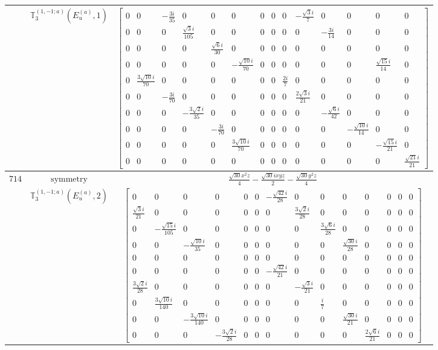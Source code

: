 \documentclass[fleqn,8pt,landscape]{jsarticle}
\begin{document}
\begin{longtable}{ccc}
$  $ & $ \mathbb{T}_{3}^{(1,-1;a)}(E_{u}^{(a)},1) $ & $ \begin{bmatrix} 0 & 0 & - \frac{3 i}{35} & 0 & 0 & 0 & 0 & 0 & 0 & - \frac{\sqrt{3} i}{7} & 0 & 0 & 0 & 0 \\ 0 & 0 & 0 & \frac{\sqrt{3} i}{105} & 0 & 0 & 0 & 0 & 0 & 0 & - \frac{3 i}{14} & 0 & 0 & 0 \\ 0 & 0 & 0 & 0 & \frac{\sqrt{6} i}{30} & 0 & 0 & 0 & 0 & 0 & 0 & 0 & 0 & 0 \\ 0 & 0 & 0 & 0 & 0 & - \frac{\sqrt{10} i}{70} & 0 & 0 & 0 & 0 & 0 & 0 & \frac{\sqrt{15} i}{14} & 0 \\ 0 & \frac{3 \sqrt{10} i}{70} & 0 & 0 & 0 & 0 & 0 & 0 & \frac{2 i}{7} & 0 & 0 & 0 & 0 & 0 \\ 0 & 0 & - \frac{3 i}{70} & 0 & 0 & 0 & 0 & 0 & 0 & \frac{2 \sqrt{3} i}{21} & 0 & 0 & 0 & 0 \\ 0 & 0 & 0 & - \frac{3 \sqrt{2} i}{35} & 0 & 0 & 0 & 0 & 0 & 0 & - \frac{\sqrt{6} i}{42} & 0 & 0 & 0 \\ 0 & 0 & 0 & 0 & - \frac{3 i}{70} & 0 & 0 & 0 & 0 & 0 & 0 & - \frac{\sqrt{10} i}{14} & 0 & 0 \\ 0 & 0 & 0 & 0 & 0 & \frac{3 \sqrt{10} i}{70} & 0 & 0 & 0 & 0 & 0 & 0 & - \frac{\sqrt{15} i}{21} & 0 \\ 0 & 0 & 0 & 0 & 0 & 0 & 0 & 0 & 0 & 0 & 0 & 0 & 0 & \frac{\sqrt{21} i}{21} \end{bmatrix} $ \\ \hline
$ 714 $ & $ \text{symmetry} $ & $ \frac{\sqrt{30} x^{2} z}{4} - \frac{\sqrt{30} i x y z}{2} - \frac{\sqrt{30} y^{2} z}{4} $ \\
$  $ & $ \mathbb{T}_{3}^{(1,-1;a)}(E_{u}^{(a)},2) $ & $ \begin{bmatrix} 0 & 0 & 0 & 0 & 0 & 0 & - \frac{\sqrt{42} i}{28} & 0 & 0 & 0 & 0 & 0 & 0 & 0 \\ \frac{\sqrt{3} i}{21} & 0 & 0 & 0 & 0 & 0 & 0 & \frac{3 \sqrt{2} i}{28} & 0 & 0 & 0 & 0 & 0 & 0 \\ 0 & - \frac{\sqrt{15} i}{105} & 0 & 0 & 0 & 0 & 0 & 0 & \frac{3 \sqrt{6} i}{28} & 0 & 0 & 0 & 0 & 0 \\ 0 & 0 & - \frac{\sqrt{10} i}{35} & 0 & 0 & 0 & 0 & 0 & 0 & \frac{\sqrt{30} i}{28} & 0 & 0 & 0 & 0 \\ 0 & 0 & 0 & 0 & 0 & 0 & 0 & 0 & 0 & 0 & 0 & 0 & 0 & 0 \\ 0 & 0 & 0 & 0 & 0 & 0 & - \frac{\sqrt{42} i}{21} & 0 & 0 & 0 & 0 & 0 & 0 & 0 \\ \frac{3 \sqrt{2} i}{28} & 0 & 0 & 0 & 0 & 0 & 0 & - \frac{\sqrt{3} i}{21} & 0 & 0 & 0 & 0 & 0 & 0 \\ 0 & \frac{3 \sqrt{10} i}{140} & 0 & 0 & 0 & 0 & 0 & 0 & \frac{i}{7} & 0 & 0 & 0 & 0 & 0 \\ 0 & 0 & - \frac{3 \sqrt{10} i}{140} & 0 & 0 & 0 & 0 & 0 & 0 & \frac{\sqrt{30} i}{21} & 0 & 0 & 0 & 0 \\ 0 & 0 & 0 & - \frac{3 \sqrt{2} i}{28} & 0 & 0 & 0 & 0 & 0 & 0 & \frac{2 \sqrt{6} i}{21} & 0 & 0 & 0 \end{bmatrix} $ \\ \hline

\end{longtable}
\end{document}
